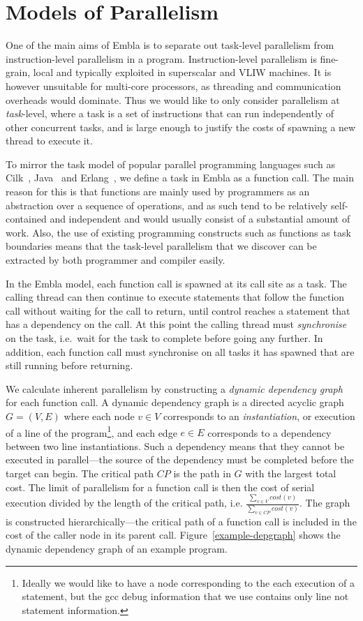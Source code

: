 \section{Models of Parallelism} \label{smethod}

One of the main aims of Embla is to separate out task-level parallelism from instruction-level parallelism in a program.
Instruction-level parallelism is fine-grain, local and typically exploited in superscalar and VLIW machines.
It is however unsuitable for multi-core processors, as threading and communication overheads would dominate.
Thus we would like to only consider parallelism at \emph{task}-level, where a task is a set of instructions that can run independently of other concurrent tasks, and is large enough to justify the costs of spawning a new thread to execute it.

To mirror the task model of popular parallel programming languages such as Cilk~\cite{blumofe96cilk}, Java~\cite{lea00java} and Erlang~\cite{armstrong07programming}, we define a task in Embla as a function call.
The main reason for this is that functions are mainly used by programmers as an abstraction over a sequence of operations, and as such tend to be relatively self-contained and independent and would usually consist of a substantial amount of work.
Also, the use of existing programming constructs such as functions as task boundaries means that the task-level parallelism that we discover can be extracted by both programmer and compiler easily.

In the Embla model, each function call is spawned at its call site as a task.
The calling thread can then continue to execute statements that follow the function call without waiting for the call to return, until control reaches a statement that has a dependency on the call.
At this point the calling thread must \emph{synchronise} on the task, i.e.\ wait for the task to complete before going any further.
In addition, each function call must synchronise on all tasks it has spawned that are still running before returning.

We calculate inherent parallelism by constructing a \emph{dynamic dependency graph} for each function call.
A dynamic dependency graph is a directed acyclic graph $G=(V,E)$ where each node $v\in V$ corresponds to an \emph{instantiation}, or execution of a line of the program\footnote{Ideally we would like to have a node corresponding to the each execution of a statement, but the gcc debug information that we use contains only line not statement information.}, and each edge $e\in E$ corresponds to a dependency between two line instantiations.
Such a dependency means that they cannot be executed in parallel---the source of the dependency must be completed before the target can begin.
The critical path $\mathit{CP}$ is the path in $G$ with the largest total cost.
The limit of parallelism for a function call is then the cost of serial execution divided by the length of the critical path, i.e. $\frac{\sum_{v\in V} cost(v)}{\sum_{v\in \mathit{CP}} cost(v)}$.
The graph is constructed hierarchically---the critical path of a function call is included in the cost of the caller node in its parent call.
Figure~\ref{example-depgraph} shows the dynamic dependency graph of an example program.


